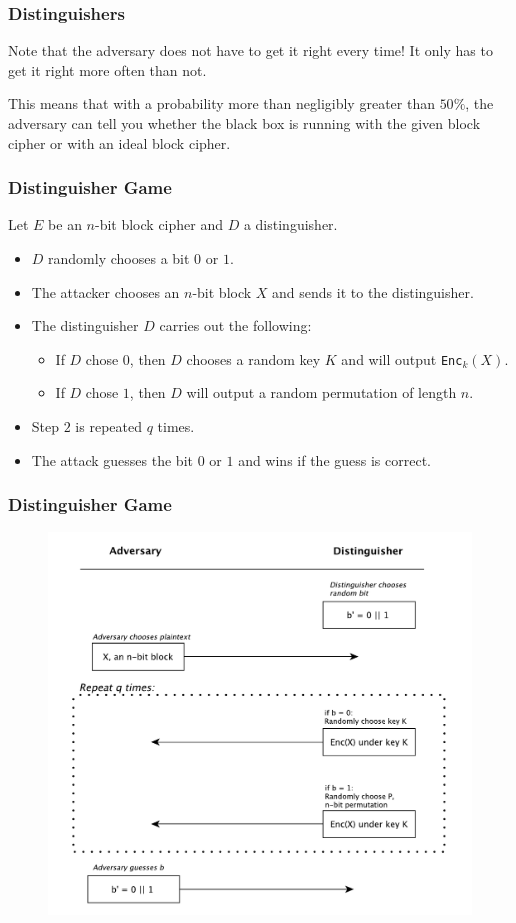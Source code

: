 \documentclass{beamer}
\newcommand{\<}{\langle}
\renewcommand{\>}{\rangle}
\begin{document}
\begin{frame}
\frametitle{Distinguishers}

Note that the adversary does not have to get it right every time! It only has to get it right more often than not. \newline

This means that with a probability more than negligibly greater than $50\%$, the adversary can tell you whether the black box is running with the given block cipher or with an ideal block cipher. 
\end{frame}


\begin{frame}[fragile]
\frametitle{Distinguisher Game}

Let $E$ be an $n$-bit block cipher and $D$ a distinguisher.
\begin{itemize}
\item $D$ randomly chooses a bit $0$ or $1$.
\item  The attacker chooses an $n$-bit block $X$ and sends it to the distinguisher.
\item  The distinguisher $D$ carries out the following:
	\begin{itemize}
	\item If $D$ chose $0$, then $D$ chooses a random key $K$ and will output \verb|Enc|$_k(X)$.
	\item If $D$ chose $1$, then $D$ will output a random permutation of length $n$.
	\end{itemize}
\item Step $2$ is repeated $q$ times.
\item The attack guesses the bit $0$ or $1$ and wins if the guess is correct. 
\end{itemize}
\end{frame}


\begin{frame}
\frametitle{Distinguisher Game}

\begin{figure}
\includegraphics[scale=.4]{IMG/game}
\end{figure}
\end{frame}
\end{document}
